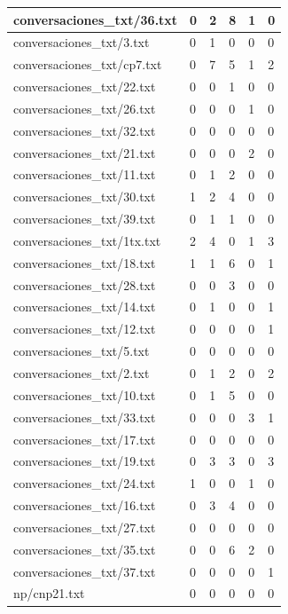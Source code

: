 \begin{center}
\begin{longtable}{|l|l|l|l|l|l|}
\hline
conversaciones\_txt/36.txt & 0 & 2 & 8 & 1 & 0 \\
\hline
conversaciones\_txt/3.txt & 0 & 1 & 0 & 0 & 0 \\
\hline
conversaciones\_txt/cp7.txt & 0 & 7 & 5 & 1 & 2 \\
\hline
conversaciones\_txt/22.txt & 0 & 0 & 1 & 0 & 0 \\
\hline
conversaciones\_txt/26.txt & 0 & 0 & 0 & 1 & 0 \\
\hline
conversaciones\_txt/32.txt & 0 & 0 & 0 & 0 & 0 \\
\hline
conversaciones\_txt/21.txt & 0 & 0 & 0 & 2 & 0 \\
\hline
conversaciones\_txt/11.txt & 0 & 1 & 2 & 0 & 0 \\
\hline
conversaciones\_txt/30.txt & 1 & 2 & 4 & 0 & 0 \\
\hline
conversaciones\_txt/39.txt & 0 & 1 & 1 & 0 & 0 \\
\hline
conversaciones\_txt/1tx.txt & 2 & 4 & 0 & 1 & 3 \\
\hline
conversaciones\_txt/18.txt & 1 & 1 & 6 & 0 & 1 \\
\hline
conversaciones\_txt/28.txt & 0 & 0 & 3 & 0 & 0 \\
\hline
conversaciones\_txt/14.txt & 0 & 1 & 0 & 0 & 1 \\
\hline
conversaciones\_txt/12.txt & 0 & 0 & 0 & 0 & 1 \\
\hline
conversaciones\_txt/5.txt & 0 & 0 & 0 & 0 & 0 \\
\hline
conversaciones\_txt/2.txt & 0 & 1 & 2 & 0 & 2 \\
\hline
conversaciones\_txt/10.txt & 0 & 1 & 5 & 0 & 0 \\
\hline
conversaciones\_txt/33.txt & 0 & 0 & 0 & 3 & 1 \\
\hline
conversaciones\_txt/17.txt & 0 & 0 & 0 & 0 & 0 \\
\hline
conversaciones\_txt/19.txt & 0 & 3 & 3 & 0 & 3 \\
\hline
conversaciones\_txt/24.txt & 1 & 0 & 0 & 1 & 0 \\
\hline
conversaciones\_txt/16.txt & 0 & 3 & 4 & 0 & 0 \\
\hline
conversaciones\_txt/27.txt & 0 & 0 & 0 & 0 & 0 \\
\hline
conversaciones\_txt/35.txt & 0 & 0 & 6 & 2 & 0 \\
\hline
conversaciones\_txt/37.txt & 0 & 0 & 0 & 0 & 1 \\
\hline
np/cnp21.txt & 0 & 0 & 0 & 0 & 0 \\

\end{longtable}
\end{center}
